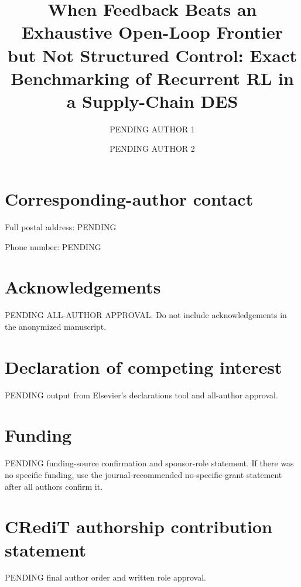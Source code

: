 \documentclass[preprint,12pt]{elsarticle}
\begin{document}
\begin{frontmatter}

\title{When Feedback Beats an Exhaustive Open-Loop Frontier but Not Structured Control:
Exact Benchmarking of Recurrent RL in a Supply-Chain DES}

\author[aff1]{PENDING AUTHOR 1}
\author[aff1]{PENDING AUTHOR 2}

\address[aff1]{PENDING FULL INSTITUTION NAME,
PENDING POSTAL ADDRESS, PENDING CITY, PENDING COUNTRY}


\end{frontmatter}

\section*{Corresponding-author contact}

Full postal address: PENDING

Phone number: PENDING

\section*{Acknowledgements}

PENDING ALL-AUTHOR APPROVAL. Do not include acknowledgements in the anonymized
manuscript.

\section*{Declaration of competing interest}

PENDING output from Elsevier's declarations tool and all-author approval.

\section*{Funding}

PENDING funding-source confirmation and sponsor-role statement. If there was no
specific funding, use the journal-recommended no-specific-grant statement after
all authors confirm it.

\section*{CRediT authorship contribution statement}

PENDING final author order and written role approval.
\end{document}
